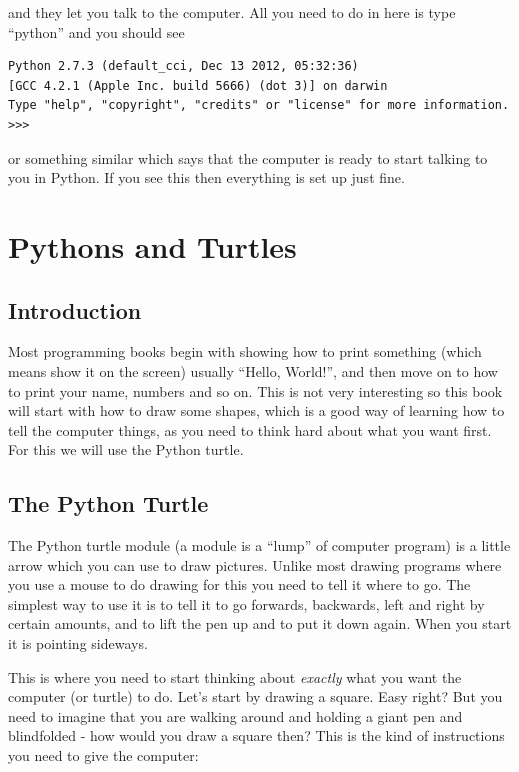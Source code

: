 \documentclass[a4paper, 11pt]{book}
\begin{document}
\noindent
and they let you talk to the computer. All you need to do in here is type ``python'' and you should see

{\small
\begin{verbatim}
Python 2.7.3 (default_cci, Dec 13 2012, 05:32:36) 
[GCC 4.2.1 (Apple Inc. build 5666) (dot 3)] on darwin
Type "help", "copyright", "credits" or "license" for more information.
>>> 
\end{verbatim}
}

\noindent 
or something similar which says that the computer is ready to start talking to you in Python. If you see this then everything is set up just fine.

\chapter{Pythons and Turtles}

\section{Introduction}

Most programming books begin with showing how to print something (which means show it on the screen) usually ``Hello, World!'', and then move on to how to print your name, numbers and so on. This is not very interesting so this book will start with how to draw some shapes, which is a good way of learning how to tell the computer things, as you need to think hard about what you want first. For this we will use the Python turtle.

\section{The Python Turtle}

The Python turtle module (a module is a ``lump'' of computer program) is a little arrow which you can use to draw pictures. Unlike most drawing programs where you use a mouse to do drawing for this you need to tell it where to go. The simplest way to use it is to tell it to go forwards, backwards, left and right by certain amounts, and to lift the pen up and to put it down again. When you start it is pointing sideways.

This is where you need to start thinking about \emph{exactly} what you want the computer (or turtle) to do. Let's start by drawing a square. Easy right? But you need to imagine that you are walking around and holding a giant pen and blindfolded - how would you draw a square then? This is the kind of instructions you need to give the computer:
\end{document}
